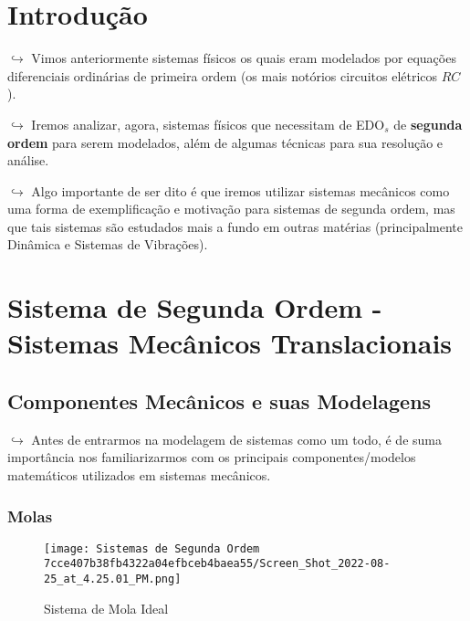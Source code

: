 \documentclass[]{article}
\begin{document}
  \hypertarget{introduuxe7uxe3o-2}{%
  \section{Introdução}\label{introduuxe7uxe3o-2}}

  \(\hookrightarrow\) Vimos anteriormente sistemas físicos os quais eram
  modelados por equações diferenciais ordinárias de primeira ordem (os
  mais notórios circuitos elétricos \(RC\)).

  \(\hookrightarrow\) Iremos analizar, agora, sistemas físicos que
  necessitam de EDO\(_s\) de \textbf{segunda ordem} para serem modelados,
  além de algumas técnicas para sua resolução e análise.

  \(\hookrightarrow\) Algo importante de ser dito é que iremos utilizar
  sistemas mecânicos como uma forma de exemplificação e motivação para
  sistemas de segunda ordem, mas que tais sistemas são estudados mais a
  fundo em outras matérias (principalmente Dinâmica e Sistemas de
  Vibrações).

  \hypertarget{sistema-de-segunda-ordem---sistemas-mecuxe2nicos-translacionais}{%
  \section{Sistema de Segunda Ordem - Sistemas Mecânicos
  Translacionais}\label{sistema-de-segunda-ordem---sistemas-mecuxe2nicos-translacionais}}

  \hypertarget{componentes-mecuxe2nicos-e-suas-modelagens}{%
  \subsection{Componentes Mecânicos e suas
  Modelagens}\label{componentes-mecuxe2nicos-e-suas-modelagens}}

  \(\hookrightarrow\) Antes de entrarmos na modelagem de sistemas como um
  todo, é de suma importância nos familiarizarmos com os principais
  componentes/modelos matemáticos utilizados em sistemas mecânicos.

  \hypertarget{molas}{%
  \subsubsection{Molas}\label{molas}}

  \begin{figure}
  \centering
  \texttt{[image: Sistemas de Segunda Ordem 7cce407b38fb4322a04efbceb4baea55/Screen\_Shot\_2022-08-25\_at\_4.25.01\_PM.png]}
  \caption{Sistema de Mola Ideal}
  \end{figure}
\end{document}
